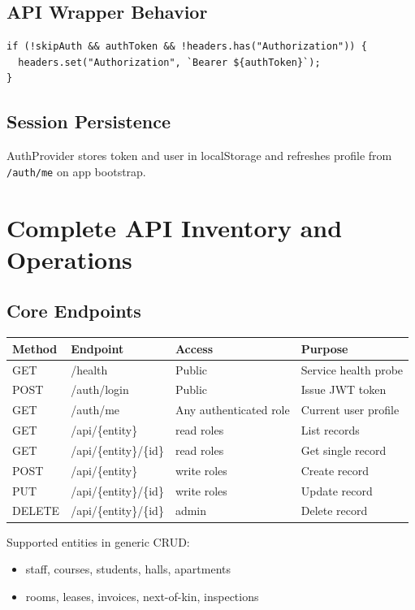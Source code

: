 \documentclass[11pt,a4paper]{article}
\begin{document}
\subsection{API Wrapper Behavior}
\begin{lstlisting}[language={},caption={Auth token injection in api.ts}]
if (!skipAuth && authToken && !headers.has("Authorization")) {
  headers.set("Authorization", `Bearer ${authToken}`);
}
\end{lstlisting}

\subsection{Session Persistence}
AuthProvider stores token and user in localStorage and refreshes profile from \texttt{/auth/me} on app bootstrap.

\section{Complete API Inventory and Operations}
\subsection{Core Endpoints}
\begin{longtable}{>{\raggedright\arraybackslash}p{} >{\raggedright\arraybackslash}p{} >{\raggedright\arraybackslash}p{} >{\raggedright\arraybackslash}p{}}
\toprule
\textbf{Method} & \textbf{Endpoint} & \textbf{Access} & \textbf{Purpose} \\
\midrule
\endhead
GET & /health & Public & Service health probe \\
POST & /auth/login & Public & Issue JWT token \\
GET & /auth/me & Any authenticated role & Current user profile \\
GET & /api/\{entity\} & read roles & List records \\
GET & /api/\{entity\}/\{id\} & read roles & Get single record \\
POST & /api/\{entity\} & write roles & Create record \\
PUT & /api/\{entity\}/\{id\} & write roles & Update record \\
DELETE & /api/\{entity\}/\{id\} & admin & Delete record \\
\bottomrule
\end{longtable}

Supported entities in generic CRUD:
\begin{itemize}
  \item staff, courses, students, halls, apartments
  \item rooms, leases, invoices, next-of-kin, inspections
\end{itemize}
\end{document}
